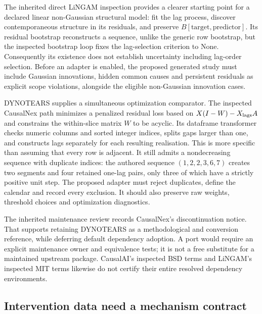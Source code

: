 The inherited direct LiNGAM inspection provides a clearer starting point
for a declared linear non-Gaussian structural model: fit the lag process,
discover contemporaneous structure in its residuals, and preserve
$B[\text{target},\text{predictor}]$. Its residual bootstrap reconstructs
a sequence, unlike the generic row bootstrap, but the inspected bootstrap
loop fixes the lag-selection criterion to None. Consequently its existence
does not establish uncertainty including lag-order selection. Before an
adapter is enabled, the proposed generated study must include Gaussian
innovations, hidden common causes and persistent residuals as explicit
scope violations, alongside the eligible non-Gaussian innovation cases.
\citep{v131_sw_lingam,exec13_pydisc_lingam,exec14_pt_contract}

DYNOTEARS supplies a simultaneous optimization comparator. The inspected
CausalNex path minimizes a penalized residual loss based on
$X(I-W)-X_{\rm lags}A$ and constrains the within-slice matrix $W$ to be
acyclic. Its dataframe transformer checks numeric columns and sorted integer
indices, splits gaps larger than one, and constructs lags separately for
each resulting realisation. This is more specific than assuming that every
row is adjacent. It still admits a nondecreasing sequence with duplicate
indices: the authored sequence $(1,2,2,3,6,7)$ creates two segments and four
retained one-lag pairs, only three of which have a strictly positive unit
step. The proposed adapter must reject duplicates, define the calendar and
record every exclusion. It should also preserve raw weights, threshold
choices and optimization diagnostics.
\citep{exec14_pt_causalnex,exec14_pt_exact,exec14_pt_paper_dynotears}

The inherited maintenance review records CausalNex's discontinuation notice.
That supports retaining DYNOTEARS as a methodological and conversion
reference, while deferring default dependency adoption. A port would require
an explicit maintenance owner and equivalence tests; it is not a free
substitute for a maintained upstream package. CausalAI's inspected BSD terms
and LiNGAM's inspected MIT terms likewise do not certify their entire
resolved dependency environments.\citep{exec14_causalnex_primary,
exec14_pt_causalai,exec13_pydisc_lingam,exec14_pt_contract}

\subsection{Intervention data need a mechanism contract}

